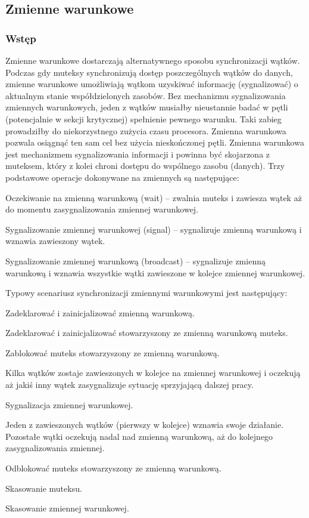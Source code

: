 \subsection{Zmienne warunkowe} 

\subsubsection{Wstęp}

Zmienne warunkowe dostarczają alternatywnego sposobu synchronizacji wątków. Podczas gdy muteksy synchronizują dostęp poszczególnych wątków do danych, zmienne warunkowe umożliwiają wątkom uzyskiwać informację (sygnalizować) o aktualnym stanie współdzielonych zasobów. Bez mechanizmu sygnalizowania zmiennych warunkowych, jeden z wątków musiałby nieustannie badać w pętli (potencjalnie w sekcji krytycznej) spełnienie pewnego warunku. Taki zabieg prowadziłby do niekorzystnego zużycia czasu procesora. Zmienna warunkowa pozwala osiągnąć ten sam cel bez użycia nieskończonej pętli. 
Zmienna warunkowa jest mechanizmem sygnalizowania informacji i powinna być skojarzona z muteksem, który z kolei chroni dostępu do wspólnego zasobu (danych). Trzy podstawowe operacje dokonywane na zmiennych są następujące: 

\begin{myitemize}
\item Oczekiwanie na zmienną warunkową (wait) – zwalnia muteks i zawiesza wątek aż do momentu zasygnalizowania zmiennej warunkowej.
\item Sygnalizowanie zmiennej warunkowej (signal) – sygnalizuje zmienną warunkową i wznawia zawieszony wątek.
\item Sygnalizowanie zmiennej warunkową (broadcast) – sygnalizuje zmienną warunkową i wznawia wszystkie wątki zawieszone w kolejce zmiennej warunkowej. 
\end{myitemize} 

Typowy scenariusz synchronizacji zmiennymi warunkowymi jest następujący: 
\begin{myitemize}
\item Zadeklarować i zainicjalizować zmienną warunkową.
\item Zadeklarować i zainicjalizować stowarzyszony ze zmienną warunkową muteks.
\item Zablokować muteks stowarzyszony ze zmienną warunkową.
\item Kilka wątków zostaje zawieszonych w kolejce na zmiennej warunkowej i oczekują aż jakiś inny wątek zasygnalizuje sytuację sprzyjającą dalszej pracy. 
\item Sygnalizacja zmiennej warunkowej. 
\item Jeden z zawieszonych wątków (pierwszy w kolejce) wznawia swoje działanie. Pozostałe wątki oczekują nadal nad zmienną warunkową, aż do kolejnego zasygnalizowania zmiennej.
\item Odblokować muteks stowarzyszony ze zmienną warunkową.
\item Skasowanie muteksu.
\item Skasowanie zmiennej warunkowej.
\end{myitemize}


